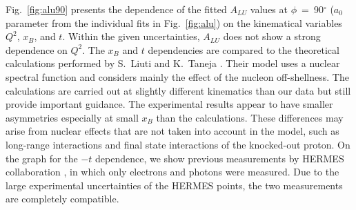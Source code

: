 \documentclass[twocolumn,nofootinbib,prl,superscriptaddress,secnumarabic,amssymb,nobibnotes,aps,floatfix]{revtex4}
\begin{document}
Fig.~\ref{fig:alu90} presents the dependence of the fitted $A_{LU}$ values at 
$\phi$~=~90$^{\circ}$ ($a_{0}$ parameter from the individual fits in 
Fig.~\ref{fig:alu}) on the kinematical variables $Q^2$, $x_{B}$, and $t$.  
Within the given uncertainties, $A_{LU}$ does not show a strong dependence on 
$Q^2$.  The $x_{B}$ and $t$ dependencies are compared to the theoretical 
calculations performed by S.~Liuti and K.~Taneja \cite{simonetta_2}. Their 
model uses a nuclear spectral function and considers mainly the effect of the 
nucleon off-shellness. The calculations are carried out at slightly different 
kinematics than our data but still provide important guidance. The experimental 
results appear to have smaller asymmetries especially at small $x_{B}$ than the 
calculations.  These differences may arise from nuclear effects that are not 
taken into account in the model, such as long-range interactions and final 
state interactions of the knocked-out proton. On the graph for the $-t$ 
dependence, we show previous measurements by HERMES collaboration 
\cite{Airapetian:2009cga}, in which only electrons and photons were measured.  
Due to the large experimental uncertainties of the HERMES points, the two 
measurements are completely compatible. 
\end{document}
